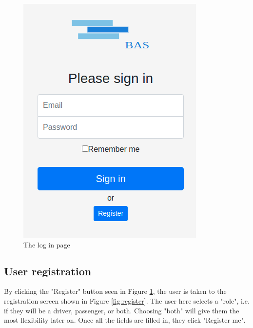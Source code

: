 \documentclass{article}
\begin{document}
\begin{figure}[h!]
    \centering
    \includegraphics[scale=0.5]{ssdFigures/login_register.png}
    \caption{The log in page}
    \label{fig:login_register}
\end{figure}

\clearpage
\newpage
\subsection{User registration}
By clicking the "Register" button seen in Figure \ref{fig:login_register}, the user is taken to the registration screen shown in Figure \ref{fig:register}. The user here selects a "role", i.e. if they will be a driver, passenger, or both. Choosing "both" will give them the most flexibility later on. Once all the fields are filled in, they click "Register me".
\end{document}
